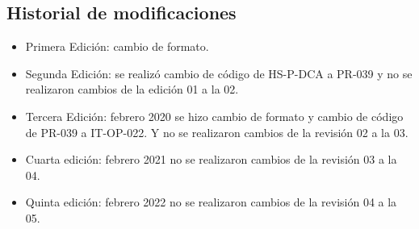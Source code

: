 \subsection{Historial de modificaciones}

\begin{itemize}
	\item Primera Edición: cambio de formato.
	\item Segunda Edición: se realizó cambio de código de HS-P-DCA a PR-039 y no se realizaron cambios de la edición 01 a la 02.
	\item Tercera Edición: febrero 2020 se hizo cambio de formato y cambio de código de PR-039 a IT-OP-022. Y no se realizaron cambios de la revisión 02 a la 03.
	\item Cuarta edición: febrero 2021 no se realizaron cambios de la revisión 03 a la 04.
	\item Quinta edición: febrero 2022 no se realizaron cambios de la revisión 04 a la 05.
\end{itemize}
